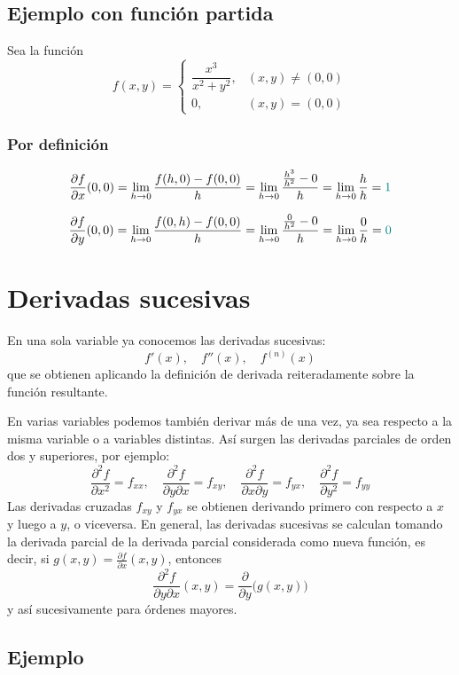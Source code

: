 \documentclass{article}
\begin{document}
\subsection*{Ejemplo con función partida}

Sea la función  
\[
f(x,y)=
\begin{cases}
\dfrac{x^{3}}{x^{2}+y^{2}}, & (x,y)\neq(0,0)\\[6pt]
0, & (x,y)=(0,0)
\end{cases}
\]

\subsubsection*{Por definición}

\[
\frac{\partial f}{\partial x}(0,0)
=
\lim_{h\to0}
\frac{f(h,0)-f(0,0)}{h}
=
\lim_{h\to0}
\frac{\tfrac{h^{3}}{h^{2}}-0}{h}
=
\lim_{h\to0}
\frac{h}{h}
=
\color{teal}1
\]

\[
\frac{\partial f}{\partial y}(0,0)
=
\lim_{h\to0}
\frac{f(0,h)-f(0,0)}{h}
=
\lim_{h\to0}
\frac{\tfrac{0}{h^{2}}-0}{h}
=
\lim_{h\to0}
\frac{0}{h}
=
\color{teal}0
\]


\section*{Derivadas sucesivas}

En una sola variable ya conocemos las derivadas sucesivas:
\[
f'(x),\quad f''(x),\quad f^{(n)}(x)
\]
que se obtienen aplicando la definición de derivada reiteradamente sobre la función resultante.  

En varias variables podemos también derivar más de una vez, ya sea respecto a la misma variable o a variables distintas. Así surgen las derivadas parciales de orden dos y superiores, por ejemplo:
\[
\frac{\partial^{2}f}{\partial x^{2}}=f_{xx},
\quad
\frac{\partial^{2}f}{\partial y \partial x}=f_{xy},
\quad
\frac{\partial^{2}f}{\partial x\partial y}=f_{yx},
\quad
\frac{\partial^{2}f}{\partial y^{2}}=f_{yy}
\]
Las derivadas cruzadas \(f_{xy}\) y \(f_{yx}\) se obtienen derivando primero con respecto a \(x\) y luego a \(y\), o viceversa. 
En general, las derivadas sucesivas se calculan tomando la derivada parcial de la derivada parcial considerada como nueva función, es decir, si \(g(x,y)=\frac{\partial f}{\partial x}(x,y)\), entonces
\[
\frac{\partial^{2}f}{\partial y\partial x }(x,y)
=\frac{\partial}{\partial y}\bigl(g(x,y)\bigr)
\]
y así sucesivamente para órdenes mayores.  


\subsection*{Ejemplo}
\end{document}
